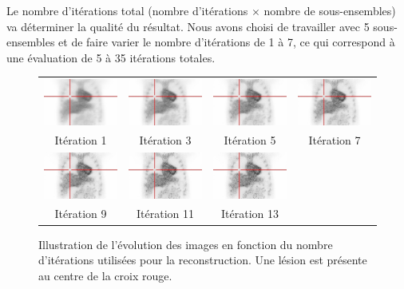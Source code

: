 Le nombre d'itérations total (nombre d'itérations $\times$ nombre de sous-ensembles) va déterminer la qualité du résultat. Nous avons choisi de travailler avec 5 sous-ensembles et de faire varier le nombre d'itérations de 1 à 7, ce qui correspond à une évaluation de 5 à 35 itérations totales.

\begin{figure}
\centering
\begin{tabular}{c c c c}
 \includegraphics[width=3cm]{images/ite1} & \includegraphics[width=3cm]{images/ite3} & \includegraphics[width=3cm]{images/ite5} & \includegraphics[width=3cm]{images/ite7} \\
Itération 1  & Itération 3 & Itération 5 & Itération 7 \\
\hline
 \includegraphics[width=3cm]{images/ite9} & \includegraphics[width=3cm]{images/ite11} & \includegraphics[width=3cm]{images/ite13} &  \\
Itération 9  & Itération 11 & Itération 13 &\\
\end{tabular}

\caption[Illustration de l'évolution des lésions en fonction du nombre d'itérations]{Illustration de l'évolution des images en fonction du nombre d'itérations utilisées pour la reconstruction. Une lésion est présente au centre de la croix rouge.}
\label{fig:evolRecon}
\end{figure}

